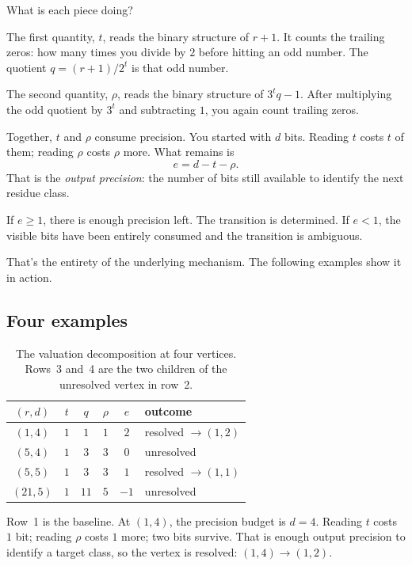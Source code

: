 \documentclass[11pt]{amsart}
\theoremstyle{definition}
\theoremstyle{remark}
\begin{document}
What is each piece doing?

The first quantity, $t$, reads the binary structure of $r+1$.  It counts the trailing zeros: how many times you divide by $2$ before hitting an odd number.  The quotient $q=(r+1)/2^t$ is that odd number.

The second quantity, $\rho$, reads the binary structure of $3^tq-1$.  After multiplying the odd quotient by $3^t$ and subtracting $1$, you again count trailing zeros.

Together, $t$ and $\rho$ consume precision.  You started with $d$ bits.  Reading $t$ costs $t$ of them; reading $\rho$ costs $\rho$ more.  What remains is
\[
e=d-t-\rho.
\]
That is the \emph{output precision}: the number of bits still available to identify the next residue class.

If $e\ge1$, there is enough precision left.  The transition is determined.  If $e<1$, the visible bits have been entirely consumed and the transition is ambiguous.

That's the entirety of the underlying mechanism. The following examples show it in action.

\subsection{Four examples}\label{subsec:examples}

\begin{table}[htbp]
\centering
\renewcommand{\arraystretch}{1.15}
\begin{tabular}{cccccl}
\toprule
$(r,d)$ & $t$ & $q$ & $\rho$ & $e$ & outcome \\
\midrule
$(1,4)$ & $1$ & $1$ & $1$ & $2$ & resolved $\to(1,2)$ \\
$(5,4)$ & $1$ & $3$ & $3$ & $0$ & unresolved \\
$(5,5)$ & $1$ & $3$ & $3$ & $1$ & resolved $\to(1,1)$ \\
$(21,5)$ & $1$ & $11$ & $5$ & $-1$ & unresolved \\
\bottomrule
\end{tabular}
\smallskip
\caption{The valuation decomposition at four vertices.  Rows~3 and~4 are the two children of the unresolved vertex in row~2.}
\label{tab:examples}
\end{table}

Row~1 is the baseline.  At $(1,4)$, the precision budget is $d=4$.  Reading $t$ costs $1$ bit; reading $\rho$ costs $1$ more; two bits survive.  That is enough output precision to identify a target class, so the vertex is resolved: $(1,4)\to(1,2)$.
\end{document}
